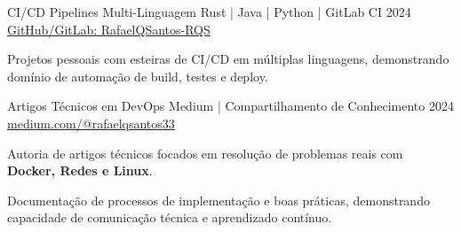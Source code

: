 \resumeProject
{CI/CD Pipelines Multi-Linguagem}
{Rust | Java | Python | GitLab CI}
{2024}
{\href{https://github.com/RafaelQSantos-RQS}{GitHub/GitLab: RafaelQSantos-RQS}}
\resumeItemListStart
\item {Projetos pessoais com esteiras de CI/CD em múltiplas linguagens, demonstrando domínio de automação de build, testes e deploy.}
\resumeItemListEnd

\resumeProject
{Artigos Técnicos em DevOps}
{Medium | Compartilhamento de Conhecimento}
{2024}
{\href{https://medium.com/@rafaelqsantos33}{medium.com/@rafaelqsantos33}}
\resumeItemListStart
\item {Autoria de artigos técnicos focados em resolução de problemas reais com \textbf{Docker, Redes e Linux}.}
\item {Documentação de processos de implementação e boas práticas, demonstrando capacidade de comunicação técnica e aprendizado contínuo.}
\resumeItemListEnd
\vspace{-2mm}

\resumeSubHeadingListEnd
\vspace{-5.5mm}


